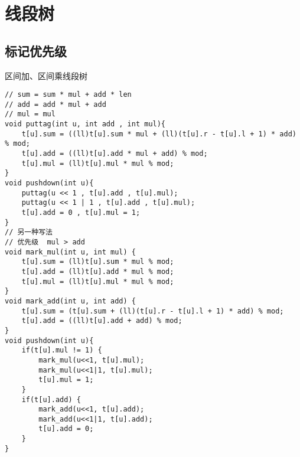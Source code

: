 \section{线段树}
\subsection{标记优先级}
\par \noindent 区间加、区间乘线段树

\begin{verbatim}
// sum = sum * mul + add * len
// add = add * mul + add
// mul = mul 
void puttag(int u, int add , int mul){
    t[u].sum = ((ll)t[u].sum * mul + (ll)(t[u].r - t[u].l + 1) * add) % mod;
    t[u].add = ((ll)t[u].add * mul + add) % mod;
    t[u].mul = (ll)t[u].mul * mul % mod;
}
void pushdown(int u){
    puttag(u << 1 , t[u].add , t[u].mul);
    puttag(u << 1 | 1 , t[u].add , t[u].mul);
    t[u].add = 0 , t[u].mul = 1;
}
// 另一种写法
// 优先级  mul > add
void mark_mul(int u, int mul) {
    t[u].sum = (ll)t[u].sum * mul % mod;
    t[u].add = (ll)t[u].add * mul % mod;
    t[u].mul = (ll)t[u].mul * mul % mod;
}
void mark_add(int u, int add) {
    t[u].sum = (t[u].sum + (ll)(t[u].r - t[u].l + 1) * add) % mod;
    t[u].add = ((ll)t[u].add + add) % mod;
}
void pushdown(int u){
    if(t[u].mul != 1) {
        mark_mul(u<<1, t[u].mul);
        mark_mul(u<<1|1, t[u].mul);
        t[u].mul = 1;
    }
    if(t[u].add) {
        mark_add(u<<1, t[u].add);
        mark_add(u<<1|1, t[u].add);
        t[u].add = 0;
    }
}
\end{verbatim}
